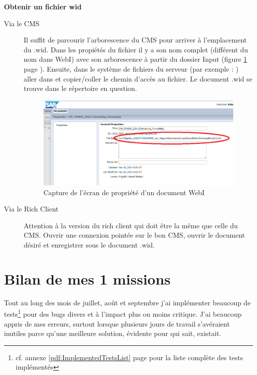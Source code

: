 \textbf{Obtenir un fichier wid}
\begin{description}
	\item[Via le CMS] Il suffit de parcourir l'arborescence du CMS pour arriver à l'emplacement du .wid. Dans les propiétés du fichier il y a son nom complet (différent du nom dans WebI) avec son arborescence à partir du dossier Input (figure \ref{figure:widFileLocation} page \pageref{figure:widFileLocation} ). Ensuite, dans le système de fichiers du serveur (par exemple : ) aller dans 
	 et copier/coller le chemin d'accès au fichier. Le document .wid se trouve dans le répertoire en question.
	\begin{figure}[!h]
  \centering
      \includegraphics[width=\textwidth]{images/widFileLocation.png}
  \caption{Capture de l'écran de propriété d'un document WebI}
	\label{figure:widFileLocation}
\end{figure}
	\item[Via le Rich Client]
	Attention à la version du rich client qui doit \^{e}tre la m\^{e}me que celle du CMS. Ouvrir une connexion pointée sur le bon CMS, ouvrir le document désiré et enregistrer sous le document .wid.
\end{description}

\section{Bilan de mes 1 missions}
Tout au long des mois de juillet, ao\^{u}t et septembre j'ai implémenter beaucoup de tests\footnote{cf. annexe \ref{pdf:ImplementedTestsList} page \pageref{pdf:ImplementedTestsList} pour la liste compl\`{e}te des tests impl\'{e}ment\'{e}s} pour des bugs divers et à l'impact plus ou moins critique. J'ai beaucoup appris de mes erreurs, surtout lorsque plusieurs jours de travail s'avéraient inutiles parce qu'une meilleure solution, évidente pour qui sait, existait.


